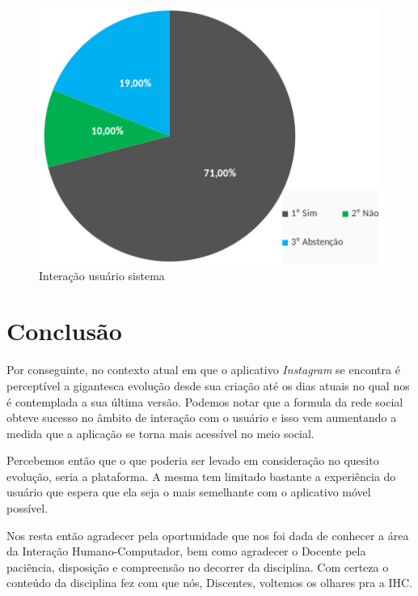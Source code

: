 \documentclass[
	12pt,				%
	openright,			%
	oneside,			%
	a4paper,			%
	english,			%
	french,				%
	spanish,			%
	brazil,				%
	]{abntex2}
\begin{document}
\begin{figure}[h]
	\caption{\label{gr05}Interação usuário sistema}
	\begin{center}
		\includegraphics[scale=0.5]{graficos/05.jpg}
	\end{center}
\end{figure}


\chapter*[Conclusão]{Conclusão}

Por conseguinte, no contexto atual em que o aplicativo \textit{Instagram} se encontra é perceptível a gigantesca evolução desde sua criação até os dias atuais no qual nos é contemplada a sua última versão. Podemos notar que a formula da rede social obteve sucesso no âmbito de interação com o usuário e isso vem aumentando a medida que a aplicação se torna mais acessível no meio social.

Percebemos então que o que poderia ser levado em consideração no quesito evolução, seria a plataforma. A mesma tem limitado bastante a experiência do usuário que espera que ela seja o mais semelhante com o aplicativo móvel possível.

Nos resta então agradecer pela oportunidade que nos foi dada de conhecer a área da Interação Humano-Computador, bem como agradecer o Docente pela paciência, disposição e compreensão no decorrer da disciplina. Com certeza o conteúdo da disciplina fez com que nós, Discentes, voltemos os olhares pra a IHC.
\end{document}
